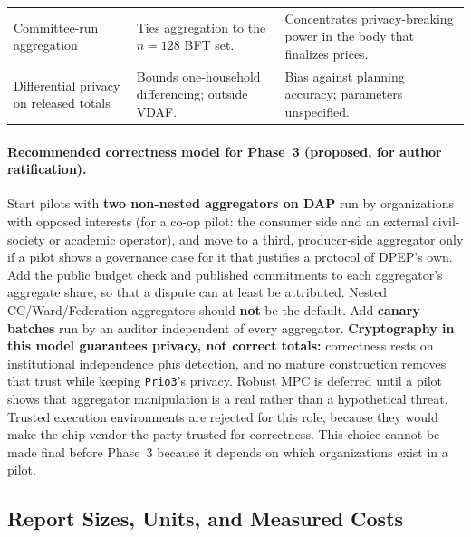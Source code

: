 \documentclass[10pt,twoside,openany]{book}
\theoremstyle{dpepstyle}
\begin{document}
\begin{table}[htbp]
\begin{tabularx}{\textwidth}{L{1.30in} L{1.40in} Y}
Committee-run aggregation & Ties aggregation to the $n=128$ BFT set. & Concentrates privacy-breaking power in the body that finalizes prices. \\
Differential privacy on released totals & Bounds one-household differencing; outside VDAF. & Bias against planning accuracy; parameters unspecified. \\
\bottomrule
\end{tabularx}
\end{table}

\paragraph{Recommended correctness model for Phase~3 (proposed, for author ratification).}
Start pilots with \textbf{two non-nested aggregators on DAP} run by organizations with opposed interests (for a co-op pilot: the consumer side and an external civil-society or academic operator), and move to a third, producer-side aggregator only if a pilot shows a governance case for it that justifies a protocol of DPEP's own. Add the public budget check and published commitments to each aggregator's aggregate share, so that a dispute can at least be attributed. Nested CC/Ward/Federation aggregators should \textbf{not} be the default. Add \textbf{canary batches} run by an auditor independent of every aggregator. \textbf{Cryptography in this model guarantees privacy, not correct totals:} correctness rests on institutional independence plus detection, and no mature construction removes that trust while keeping \texttt{Prio3}'s privacy. Robust MPC is deferred until a pilot shows that aggregator manipulation is a real rather than a hypothetical threat. Trusted execution environments are rejected for this role, because they would make the chip vendor the party trusted for correctness. This choice cannot be made final before Phase~3 because it depends on which organizations exist in a pilot.

\subsection{Report Sizes, Units, and Measured Costs}
\label{sec:prio3-cost}
\end{document}
